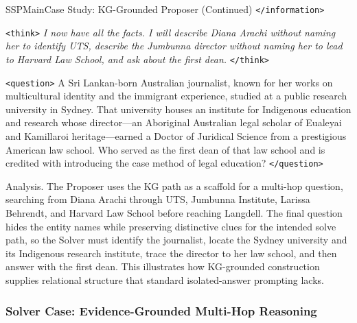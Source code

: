 \begin{casepagebox}{SSPMain}{Case Study: KG-Grounded Proposer (Continued)}
\textcolor{TagInfo}{\texttt{</information>}}
\vspace{3mm}

\begin{thinkpanel}
\textcolor{TagThink}{\texttt{<think>}} \textit{I now have all the facts. I will describe Diana Arachi without naming her to identify UTS, describe the Jumbunna director without naming her to lead to Harvard Law School, and ask about the first dean.} \textcolor{TagThink}{\texttt{</think>}}
\end{thinkpanel}

\vspace{2mm}
\textcolor{TagSearch}{\texttt{<question>}} A Sri Lankan-born Australian journalist, known for her works on multicultural identity and the immigrant experience, studied at a public research university in Sydney. That university houses an institute for Indigenous education and research whose director---an Aboriginal Australian legal scholar of Eualeyai and Kamillaroi heritage---earned a Doctor of Juridical Science from a prestigious American law school. Who served as the first dean of that law school and is credited with introducing the case method of legal education? \textcolor{TagSearch}{\texttt{</question>}}

\end{casepagebox}

\noindent Analysis.
The Proposer uses the KG path as a scaffold for a multi-hop question, searching from Diana Arachi through UTS, Jumbunna Institute, Larissa Behrendt, and Harvard Law School before reaching Langdell.
The final question hides the entity names while preserving distinctive clues for the intended solve path, so the Solver must identify the journalist, locate the Sydney university and its Indigenous research institute, trace the director to her law school, and then answer with the first dean.
This illustrates how KG-grounded construction supplies relational structure that standard isolated-answer prompting lacks.



\subsubsection{Solver Case: Evidence-Grounded Multi-Hop Reasoning}
\label{app:cases:solver}

